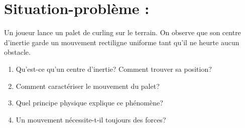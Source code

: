 \documentclass[13pt]{article}
\begin{document}
\section*{Situation-problème :}

Un joueur lance un palet de curling sur le terrain. On observe que son centre d'inertie garde un mouvement rectiligne uniforme tant qu'il ne heurte aucun obstacle.

\begin{enumerate}
	\item Qu'est-ce qu'un centre d'inertie? Comment trouver sa position?
	\item Comment caractériser le mouvement du palet?
	\item Quel principe physique explique ce phénomène?
	\item Un mouvement nécessite-t-il toujours des forces?
\end{enumerate}
\end{document}
